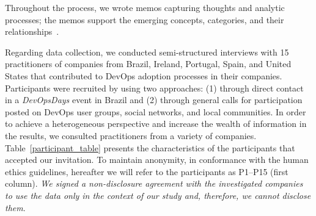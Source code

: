 Throughout the process, we wrote memos capturing thoughts and analytic
processes; the memos support the emerging concepts, categories, and their
relationships~\cite{adolph2012reconciling}.

Regarding data collection, we conducted semi-structured interviews with 15 practitioners of companies from
Brazil, Ireland, Portugal, Spain, and United States that
contributed to DevOps adoption processes in their companies. Participants
were recruited by using two approaches: (1) through direct contact in a \emph{DevOpsDays}
event in Brazil and (2) through general
calls for participation posted on DevOps user groups, social networks,
and local communities. In order to achieve a heterogeneous perspective
and increase the wealth of information in the results,
we consulted practitioners from a variety of companies.
Table~\ref{participant_table} presents the characteristics of the participants
that accepted our invitation.
To maintain anonymity, in conformance with the human ethics guidelines,
hereafter we will refer to the participants as P1--P15 (first column). \emph{We
signed a non-disclosure agreement with the investigated companies to use the
data only in the context of our study and, therefore, we cannot disclose them}.

